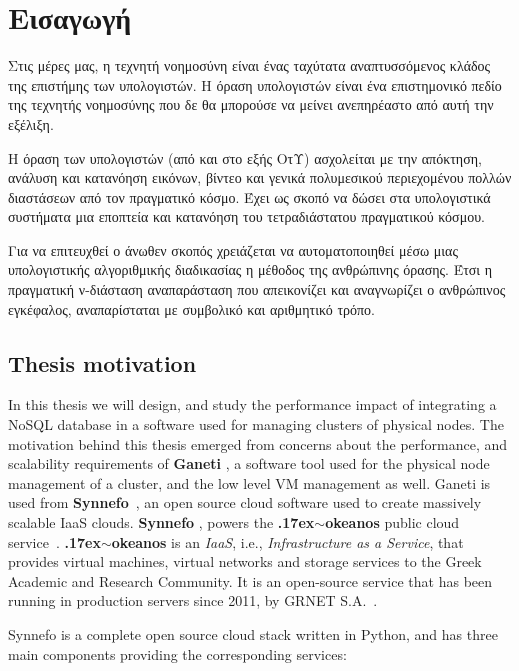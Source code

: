 \chapter{Εισαγωγή}\label{ch:introduction}

Στις μέρες μας, η τεχνητή νοημοσύνη είναι ένας ταχύτατα αναπτυσσόμενος κλάδος
της επιστήμης των υπολογιστών. Η όραση υπολογιστών είναι ένα επιστημονικό πεδίο
της τεχνητής νοημοσύνης που δε θα μπορούσε να μείνει ανεπηρέαστο από αυτή την
εξέλιξη.

Η όραση των υπολογιστών (από και στο εξής ΟτΥ) ασχολείται με την απόκτηση,
ανάλυση και κατανόηση εικόνων, βίντεο και γενικά πολυμεσικού περιεχομένου
πολλών διαστάσεων από τον πραγματικό κόσμο. Έχει ως σκοπό να δώσει στα
υπολογιστικά συστήματα μια εποπτεία και κατανόηση του τετραδιάστατου
πραγματικού κόσμου.

Για να επιτευχθεί ο άνωθεν σκοπός χρειάζεται να αυτοματοποιηθεί μέσω μιας
υπολογιστικής αλγοριθμικής διαδικασίας η μέθοδος της ανθρώπινης όρασης. Έτσι
η πραγματική ν-διάσταση αναπαράσταση που απεικονίζει και αναγνωρίζει ο
ανθρώπινος εγκέφαλος, αναπαρίσταται με συμβολικό και αριθμητικό τρόπο.


\section{Thesis motivation}

In this thesis we will design, and study the performance impact of integrating a
NoSQL database in a software used for managing clusters of physical nodes. The
motivation behind this thesis emerged from concerns about the performance, and
scalability requirements of \textbf{Ganeti}
, a software tool used for the physical
node management of a cluster, and the low level VM management as well. Ganeti is
used from \textbf{Synnefo}~, an open source cloud
software used to create massively scalable IaaS clouds. \textbf{Synnefo}
\cite{synnefo}, powers the \textbf{\raise.17ex\hbox{$\scriptstyle\sim$}okeanos}
public cloud service~\cite{okeanos}.
\textbf{\raise.17ex\hbox{$\scriptstyle\sim$}okeanos} is an \emph{IaaS}, i.e.,
\emph{Infrastructure as a Service}, that provides virtual machines, virtual
networks and storage services to the Greek Academic and Research Community. It
is an open-source service that has been running in production servers since
2011, by GRNET S.A.~.

Synnefo is a complete open source cloud stack written in Python, and has three
main components providing the corresponding services:

